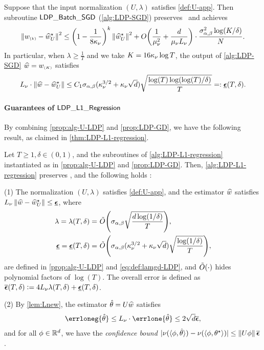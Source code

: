 \begin{proposition}\label{prop:LDP-GD}
Suppose that the input normalization $(U,\lambda)$ satisfies \eqref{def:U-app}. Then subroutine $\mathsf{LDP\_Batch\_SGD}$ (\cref{alg:LDP-SGD}) preserves \aLDP~and
 achieves \whp
\begin{align*}
    \left\|w_{\scriptscriptstyle{ (k) }}-\widehat{w}^\star_U\right\|^2\leq {\left(  1-\frac{1}{8\kappa_\nu}  \right)}^k\left\|\widehat{w}^\star_U\right\|^2+O{\left( \frac{1}{\mu_\nu^2}+\frac{d}{\mu_\nu L_\nu} \right)}\cdot \frac{\sigma_{\alpha,\beta}^2\log(K/\delta)}{N}.
\end{align*} 
In particular, when $\lambda\geq \frac{1}{T}$ and we take $K=16\kappa_\nu \log T$, the output of \cref{alg:LDP-SGD} $\widehat{w}=w_{\scriptscriptstyle{ (K) }}$ satisfies
\begin{align}\label{eq:def:lamgd-LDP}
    \Lipg\cdot \nrm{\hw-\hwst}\leq C_1 \siga (\kpg^{3/2}+\kpg\sqrt{d}) \sqrt{\frac{\log(T)\log(\log(T)/\delta)}{T}}=:\lamgd(T,\delta).
\end{align}
\end{proposition}

\paragraph{Guarantees of $\mathsf{LDP\_L1\_Regression}$} By combining \cref{prop:alg-U-LDP} and \cref{prop:LDP-GD}, we have the following result, as claimed in \cref{thm:LDP-L1-regression}.

\begin{theorem}\label{thm:LDP-L1-regression-full}
Let $T\geq 1, \delta\in(0,1)$, and the subroutines of \cref{alg:LDP-L1-regression} instantiated as in \cref{prop:alg-U-LDP} and \cref{prop:LDP-GD}. Then, \cref{alg:LDP-L1-regression} preserves \aLDP, and the following holds \whp[2\delta]:

(1) The normalization $(U,\lambda)$ satisfies \eqref{def:U-app}, and the estimator $\widehat{w}$ satisfies $\Lipg\nrm{\hw-\hwst}\leq \lamgd$, where
\begin{align*}
    \lambda=\lambda(T,\delta)=&~ \tbO{ \siga\sqrt{\frac{d\log(1/\delta)}{T}} }, \\
    \lamgd=\lamgd(T,\delta)=&~ \tbO{\siga (\kpg^{3/2}+\kpg\sqrt{d})\sqrt{\frac{\log(1/\delta)}{T}}},
\end{align*}
are defined in \cref{prop:alg-U-LDP} and \eqref{eq:def:lamgd-LDP}, and $\tilde{O}{\left( \cdot \right)}$ hides polynomial factors of $\log(T)$. The overall error is defined as $\lamall(T,\delta)\defeq 4\Lipg\lambda(T,\delta)+\lamgd(T,\delta)$.

(2) By \cref{lem:Lnew}, the estimator $\hat{\theta}=U\widehat{w}$ satisfies
\begin{align*}
    \errloneg{\hth}\leq \Lipg\cdot \errlone{\hth}\leq  2\sqrt{d} \lamall,
\end{align*}
and for all $\phi\in\mathbb{R}^d$, we have the \emph{confidence bound} $| \nu(\langle \phi, \hat{\theta} \rangle) - \nu(\langle \phi,\theta^\star \rangle) |\leq \left\|U\phi\right\| \overline{\boldsymbol{\epsilon}}$.
\end{theorem}


